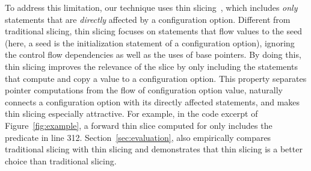 

To address this limitation, our technique uses thin
slicing~\cite{Sridharan:2007}, which includes
\textit{only} statements that are \textit{directly} affected by a configuration option.
Different from traditional slicing, thin slicing
focuses on statements that flow values to the seed (here, a
seed is the initialization statement of a configuration option), ignoring the 
control flow dependencies as well as the uses of
base pointers. By doing this, thin slicing improves the relevance
of the slice by only including the statements that compute
and copy a value to a configuration option.
This property separates
pointer computations from the flow of configuration option value,
naturally connects a configuration option with its
directly affected statements, and makes thin slicing
especially attractive.
For example, in the code excerpt of Figure~\ref{fig:example},
a forward thin slice computed for 
only includes the predicate in line 312.
Section~\ref{sec:evaluation}, 
also empirically compares traditional slicing with
thin slicing and demonstrates that thin slicing is a better choice
than traditional slicing.




% 
